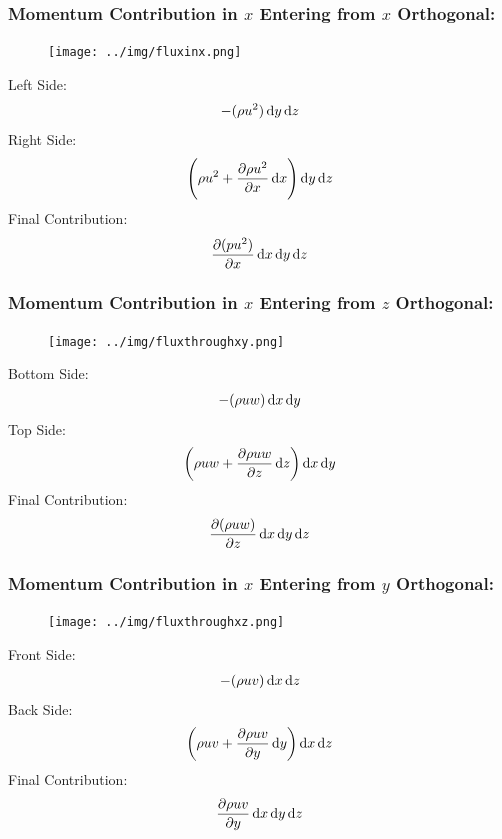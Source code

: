 \documentclass[class=report, crop=false, 12pt,a4paper]{standalone}
\begin{document}
\subsubsection{Momentum Contribution in $x$ Entering from $x$ Orthogonal:}
\begin{figure}[H]
  \centering
  \texttt{[image: ../img/fluxinx.png]}
\end{figure}
Left Side:
\begin{gather}
  -(\rho u^2)\dif y \dif z
\end{gather}
Right Side:
\begin{gather}
  \left(\rho u^2 + \frac{\partial \rho u^2}{\partial x} \dif x \right) \dif y \dif z
\end{gather}
Final Contribution:
\begin{equation}
  \frac{\partial (p u^2)}{\partial x} \dif x \dif y \dif z
  \label{xmomentumcontribution}
\end{equation}
\subsubsection{Momentum Contribution in $x$ Entering from $z$ Orthogonal:}
\begin{figure}[H]
  \centering
  \texttt{[image: ../img/fluxthroughxy.png]}
\end{figure}
Bottom Side:
\begin{gather}
  -(\rho u w) \dif x \dif y
\end{gather}
Top Side:
\begin{gather}
  \left(\rho u w + \frac{\partial \rho u w}{\partial z} \dif z \right) \dif x \dif y
\end{gather}
Final Contribution:
\begin{equation}
  \frac{\partial (\rho u w)}{\partial z} \dif x \dif y \dif z
  \label{zmomentumcontribution}
\end{equation}
\subsubsection{Momentum Contribution in $x$ Entering from $y$ Orthogonal:}
\begin{figure}[H]
  \centering
  \texttt{[image: ../img/fluxthroughxz.png]}
\end{figure}
Front Side:
\begin{gather}
  -(\rho u v) \dif x \dif z
\end{gather}
Back Side:
\begin{gather}
  \left(\rho u v + \frac{\partial \rho u v}{\partial y} \dif y \right) \dif x \dif z
\end{gather}
Final Contribution:
\begin{equation}
  \frac{\partial \rho u v}{\partial y} \dif x \dif y \dif z
  \label{ymomentumcontribution}
\end{equation}
\end{document}
